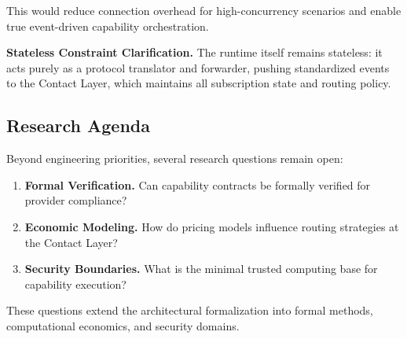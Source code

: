 This would reduce connection overhead for high-concurrency scenarios and enable true event-driven capability orchestration.

\textbf{Stateless Constraint Clarification.} The runtime itself remains stateless: it acts purely as a protocol translator and forwarder, pushing standardized events to the Contact Layer, which maintains all subscription state and routing policy.

\subsection{Research Agenda}

Beyond engineering priorities, several research questions remain open:
\begin{enumerate}
    \item \textbf{Formal Verification.} Can capability contracts be formally verified for provider compliance?
    \item \textbf{Economic Modeling.} How do pricing models influence routing strategies at the Contact Layer?
    \item \textbf{Security Boundaries.} What is the minimal trusted computing base for capability execution?
\end{enumerate}

These questions extend the architectural formalization into formal methods, computational economics, and security domains.
